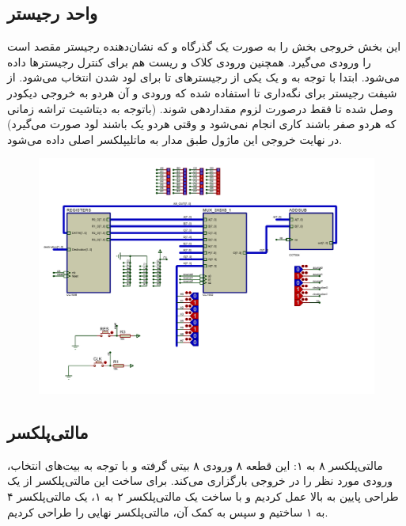 \documentclass{article}
\begin{document}
\subsection{واحد رجیستر}
این بخش خروجی بخش را به صورت یک گذرگاه  و  که نشان‌دهنده رجیستر مقصد است را ورودی می‌گیرد. همچنین ورودی کلاک و ریست هم برای کنترل رجیسترها داده می‌شود.
ابتدا با توجه به  و یک  یکی از رجیسترهای  تا  برای لود شدن انتخاب می‌شود. از شیفت رجیستر  برای نگه‌داری  تا  استفاده شده که ورودی  و  آن هردو به خروجی دیکودر وصل شده تا فقط درصورت لزوم مقداردهی شوند. (باتوجه به دیتاشیت تراشه زمانی که هردو  صفر باشند کاری انجام نمی‌شود و وقتی هردو یک باشند لود صورت می‌گیرد)
در نهایت خروجی این ماژول طبق مدار به ماتلیپلکسر اصلی داده می‌شود.
\begin{figure}[H]
	\centering
	\includegraphics[scale=0.5,page=4]{graphics}
\end{figure}
\subsection{مالتی‌پلکسر}
مالتی‌پلکسر ۸ به ۱:
این قطعه ۸ ورودی ۸ بیتی گرفته و با توجه به بیت‌های انتخاب، ورودی مورد نظر را در خروجی بارگزاری می‌کند.
برای ساخت این مالتی‌پلکسر از یک طراحی پایین به بالا عمل کردیم و با ساخت یک مالتی‌پلکسر ۲ به ۱، یک مالتی‌پلکسر ۴ به ۱ ساختیم و سپس به کمک آن، مالتی‌پلکسر نهایی را طراحی کردیم.
\end{document}
